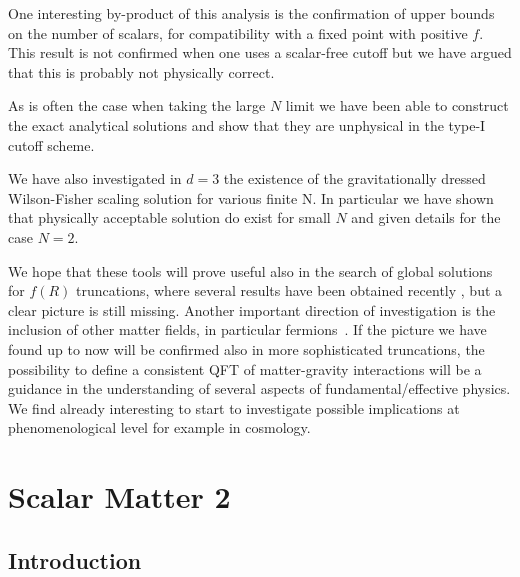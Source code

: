 \documentclass[11pt]{book} %
\begin{document}
One interesting by-product of this analysis is the confirmation
of upper bounds on the number of scalars, for compatibility with
a fixed point with positive $f$.
This result is not confirmed when one uses a scalar-free cutoff
but we have argued that this is probably not physically correct.

As is often the case when taking the large $N$ limit we have been
able to construct the exact analytical solutions
and show that they are unphysical in the type-I cutoff scheme.

We have also investigated in $d=3$ the existence of the gravitationally
dressed Wilson-Fisher scaling solution for various finite N.
In particular we have shown that physically acceptable solution do exist
for small $N$ and given details for the case $N=2$.

We hope that these tools will prove useful also in the search
of global solutions for $f(R)$ truncations,
where several results have been obtained recently
\cite{Benedetti:2012dx,Benedetti:2013jk,Demmel:2012ub,Dietz:2012ic,Dietz:2013sba,Demmel:2015oqa},
but a clear picture is still missing.
Another important direction of investigation is the inclusion of other matter fields,
in particular fermions~\cite{Zanusso:2009bs,Vacca:2010mj,Eichhorn:2011pc,Vacca:2015nta}.
If the picture we have found up to now will be confirmed also in more sophisticated truncations,
the possibility to define a consistent QFT of matter-gravity interactions
will be a guidance in the understanding of several aspects of fundamental/effective physics.
We find already interesting to start to investigate possible implications at
phenomenological level for example in cosmology.



\chapter{Scalar Matter 2}

\section{Introduction}
%
\end{document}
